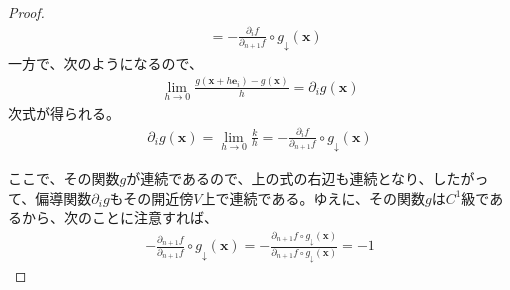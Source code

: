 \documentclass[dvipdfmx]{jsarticle}
\begin{document}
\begin{proof}
\begin{align*}
&= - \frac{\partial_{i}f}{\partial_{n + 1}f} \circ g_{\downarrow}\left( \mathbf{x} \right)
\end{align*}
一方で、次のようになるので、
\begin{align*}
\lim_{h \rightarrow 0}\frac{g\left( \mathbf{x} + h\mathbf{e}_{i} \right) - g\left( \mathbf{x} \right)}{h} = \partial_{i}g\left( \mathbf{x} \right)
\end{align*}
次式が得られる。
\begin{align*}
\partial_{i}g\left( \mathbf{x} \right) = \lim_{h \rightarrow 0}\frac{k}{h} = - \frac{\partial_{i}f}{\partial_{n + 1}f} \circ g_{\downarrow}\left( \mathbf{x} \right)
\end{align*}\par
ここで、その関数$g$が連続であるので、上の式の右辺も連続となり、したがって、偏導関数$\partial_{i}g$もその開近傍$V$上で連続である。ゆえに、その関数$g$は$C^{1}$級であるから、次のことに注意すれば、
\begin{align*}
- \frac{\partial_{n+1}f}{\partial_{n + 1}f} \circ g_{\downarrow}\left( \mathbf{x} \right) = - \frac{\partial_{n+1}f \circ g_{\downarrow}\left( \mathbf{x} \right) }{\partial_{n + 1}f \circ g_{\downarrow}\left( \mathbf{x} \right) } =-1
\end{align*}
\begin{comment}
\begin{align*}
\mathrm{grad}g\left( \mathbf{x} \right) &= \begin{pmatrix}
\partial_{1}g\left( \mathbf{x} \right) \\
\partial_{2}g\left( \mathbf{x} \right) \\
 \vdots \\
\partial_{n}g\left( \mathbf{x} \right) \\
\end{pmatrix} = \begin{pmatrix}
 - \frac{\partial_{1}f}{\partial_{n + 1}f} \circ g_{\downarrow}\left( \mathbf{x} \right) \\
 - \frac{\partial_{2}f}{\partial_{n + 1}f} \circ g_{\downarrow}\left( \mathbf{x} \right) \\
 \vdots \\
 - \frac{\partial_{n}f}{\partial_{n + 1}f} \circ g_{\downarrow}\left( \mathbf{x} \right) \\
\end{pmatrix}\\
&= - \left( \frac{1}{\partial_{n + 1}f}\begin{pmatrix}
\partial_{1}f \\

\end{comment}
\end{proof}
\end{document}
